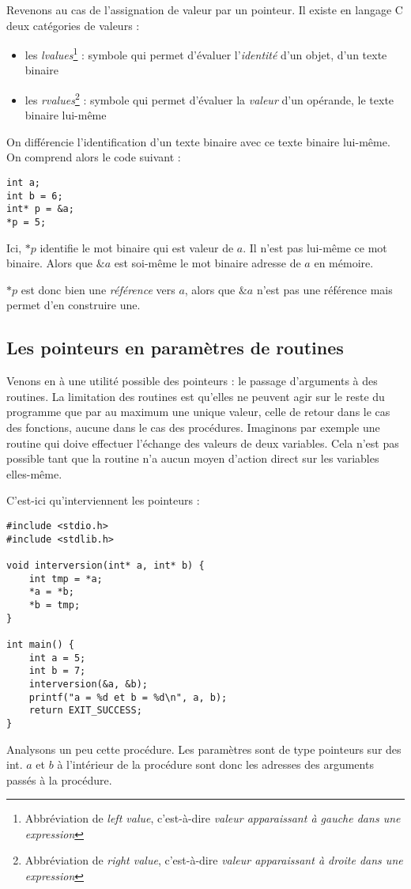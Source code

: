 \documentclass[../../../main.tex]{subfiles}
\begin{document}
Revenons au cas de l'assignation de valeur par un pointeur. Il existe en langage C deux catégories de valeurs :
\begin{itemize}
	\item les \textit{lvalues}\footnote{Abbréviation de \textit{left value}, c'est-à-dire \textit{valeur apparaissant à gauche dans une expression}} : symbole qui permet d'évaluer l'\textit{identité} d'un objet, d'un texte binaire
	\item les \textit{rvalues}\footnote{Abbréviation de \textit{right value}, c'est-à-dire \textit{valeur apparaissant à droite dans une expression}} : symbole qui permet d'évaluer la \textit{valeur} d'un opérande, le texte binaire lui-même
\end{itemize}
On différencie l'identification d'un texte binaire avec ce texte binaire lui-même. On comprend alors le code suivant :
\begin{verbatim}
int a;
int b = 6;
int* p = &a;
*p = 5;
\end{verbatim}
Ici, $*p$ identifie le mot binaire qui est valeur de $a$. Il n'est pas lui-même ce mot binaire. Alors que $\&a$ est soi-même le mot binaire adresse de $a$ en mémoire.

$*p$ est donc bien une \textit{référence} vers $a$, alors que $\&a$ n'est pas une référence mais permet d'en construire une.
\subsection{Les pointeurs en paramètres de routines}
\label{sub:les_pointeurs_en_param_tres_de_routines}
Venons en à une utilité possible des pointeurs : le passage d'arguments à des routines. La limitation des routines est qu'elles ne peuvent agir sur le reste du programme que par au maximum une unique valeur, celle de retour dans le cas des fonctions, aucune dans le cas des procédures. Imaginons par exemple une routine qui doive effectuer l'échange des valeurs de deux variables. Cela n'est pas possible tant que la routine n'a aucun moyen d'action direct sur les variables elles-même.

C'est-ici qu'interviennent les pointeurs :
\begin{verbatim}
#include <stdio.h>
#include <stdlib.h>

void interversion(int* a, int* b) {
	int tmp = *a;
	*a = *b;
	*b = tmp;
}

int main() {
	int a = 5;
	int b = 7;
	interversion(&a, &b);
	printf("a = %d et b = %d\n", a, b);
	return EXIT_SUCCESS;
}
\end{verbatim}
Analysons un peu cette procédure. Les paramètres sont de type pointeurs sur des \textsf{int}. $a$ et $b$ à l'intérieur de la procédure sont donc les adresses des arguments passés à la procédure.
 
\end{document}
